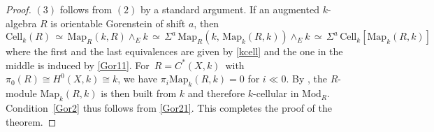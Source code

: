 \documentclass[11pt]{amsart}
\theoremstyle{definition}
\theoremstyle{remark}
\numberwithin{equation}{section}
\newcommand{\la}{\label}
\newcommand{\Map}{\mathrm{Map}}
\newcommand{\Cell}{\mathrm{Cell}}
\def\Mod{\mathrm{Mod}}
\begin{document}
\begin{proof}
$(3)$ follows from $(2)$ by a standard argument. If an augmented $k$-algebra $R$ is orientable Gorenstein of shift $a$, then
%
\begin{equation}
\la{Gor21}
\Cell_k(R)\, \simeq \,\Map_R(k, R) \wedge_E k\, \simeq\, \Sigma^a\,\Map_R(k,\,\Map_k(R,k)) \wedge_E k 
\,\simeq \,\Sigma^a\,\Cell_k[\Map_k(R,k)]
\end{equation}
%
where the first and the last equivalences are given by \eqref{kcell} and the one in the middle is induced by
\eqref{Gor11}. For $\, R = C^*(X, k) \,$ with $ \pi_0(R) \cong H^0(X,k) \cong k $, we have $ \pi_i \Map_k(R,k) = 0 $ for $ i \ll 0 $. By \cite[Remark 3.17]{DGI06}, the $R$-module $ \Map_k(R,k) $ is then 
built from $k$ and therefore $k$-cellular in $ \Mod_R $. Condition~\ref{Gor2} thus follows from \eqref{Gor21}.
This completes the proof of the theorem.
\end{proof}
%
\end{document}
